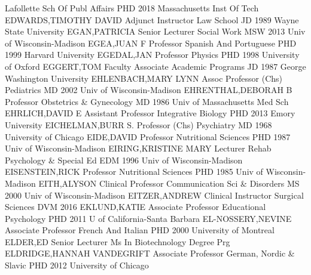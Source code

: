 \documentclass[
]{article}
\begin{document}
\textbar{}  \textbar Lafollette Sch Of Publ Affairs
\textbar PHD 2018 Massachusetts Inst Of Tech \textbar EDWARDS,TIMOTHY
DAVID \textbar Adjunct Instructor \textbar{}  \textbar Law
School \textbar JD 1989 Wayne State University \textbar EGAN,PATRICIA
\textbar Senior Lecturer \textbar{}  \textbar Social Work
\textbar MSW 2013 Univ of Wisconsin-Madison \textbar EGEA,JUAN F
\textbar Professor \textbar{}  \textbar Spanish And
Portuguese \textbar PHD 1999 Harvard University \textbar EGEDAL,JAN
\textbar Professor \textbar{}  \textbar Physics \textbar PHD
1998 University of Oxford \textbar EGGERT,TOM \textbar Faculty Associate
\textbar{}  \textbar Academic Programs \textbar JD 1987
George Washington University \textbar EHLENBACH,MARY LYNN \textbar Assoc
Professor (Chs) \textbar{}  \textbar Pediatrics \textbar MD
2002 Univ of Wisconsin-Madison \textbar EHRENTHAL,DEBORAH B
\textbar Professor \textbar{}  \textbar Obstetrics \&
Gynecology \textbar MD 1986 Univ of Massachusetts Med Sch
\textbar EHRLICH,DAVID E \textbar Assistant Professor \textbar{}
 \textbar Integrative Biology \textbar PHD 2013 Emory
University \textbar EICHELMAN,BURR S. \textbar Professor (Chs)
\textbar{}  \textbar Psychiatry \textbar MD 1968 University
of Chicago \textbar EIDE,DAVID \textbar Professor \textbar{} 
\textbar Nutritional Sciences \textbar PHD 1987 Univ of
Wisconsin-Madison \textbar EIRING,KRISTINE MARY \textbar Lecturer
\textbar{}  \textbar Rehab Psychology \& Special Ed
\textbar EDM 1996 Univ of Wisconsin-Madison \textbar EISENSTEIN,RICK
\textbar Professor \textbar{}  \textbar Nutritional Sciences
\textbar PHD 1985 Univ of Wisconsin-Madison \textbar EITH,ALYSON
\textbar Clinical Professor \textbar{} 
\textbar Communication Sci \& Disorders \textbar MS 2000 Univ of
Wisconsin-Madison \textbar EITZER,ANDREW \textbar Clinical Instructor
\textbar{}  \textbar Surgical Sciences \textbar DVM 2016
\textbar EKLUND,KATIE \textbar Associate Professor \textbar{}
 \textbar Educational Psychology \textbar PHD 2011 U of
California-Santa Barbara \textbar EL-NOSSERY,NEVINE \textbar Associate
Professor \textbar{}  \textbar French And Italian
\textbar PHD 2000 University of Montreal \textbar ELDER,ED
\textbar Senior Lecturer \textbar{}  \textbar Ms In
Biotechnology Degree Prg \textbar ELDRIDGE,HANNAH VANDEGRIFT
\textbar Associate Professor \textbar German, Nordic \& Slavic
\textbar{}  \textbar PHD 2012 University of Chicago
\end{document}
